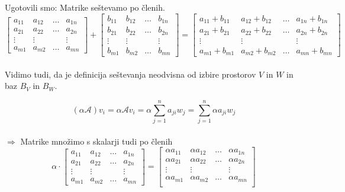 \documentclass[a4paper,12pt]{article}
\begin{document}
Ugotovili smo: Matrike seštevamo po členih. \\

$$
\begin{bmatrix}
	a_{11}&a_{12}&\ldots&a_{1n} \\
	a_{21}&a_{22}&\ldots&a_{2n} \\
	\vdots&\vdots&~&\vdots \\
	a_{m1}&a_{m2}&\ldots&a_{mn}
\end{bmatrix}
+
\begin{bmatrix}
	b_{11}&b_{12}&\ldots&b_{1n} \\
	b_{21}&b_{22}&\ldots&b_{2n} \\
	\vdots&\vdots&~&\vdots \\
	b_{m1}&b_{m2}&\ldots&b_{mn}
\end{bmatrix}
=
\begin{bmatrix}
	a_{11}+b_{11}&a_{12}+b_{12}&\ldots&a_{1n}+b_{1n} \\
	a_{21}+b_{21}&a_{22}+b_{22}&\ldots&a_{2n}+b_{2n} \\
	\vdots&\vdots&~&\vdots \\
	a_{m1}+b_{m1}&a_{m2}+b_{m2}&\ldots&a_{mn}+b_{mn}
\end{bmatrix}
$$ \\

Vidimo tudi, da je definicija seštevanja neodvisna od izbire prostorov $V$ in $W$ in baz $B_V$ in $B_W$.

$$ (\alpha \mathcal{A})v_i=\alpha \mathcal{A}v_i=\alpha \sum_{j=1}^n a_{ji} w_j=\sum_{j=1}^n \alpha a_{ji} w_j $$ \\

$\Rightarrow$ Matrike množimo s skalarji tudi po členih \\

$$ \alpha \cdot 
\begin{bmatrix}
	a_{11}&a_{12}&\ldots&a_{1n} \\
	a_{21}&a_{22}&\ldots&a_{2n} \\
	\vdots&\vdots&~&\vdots \\
	a_{m1}&a_{m2}&\ldots&a_{mn}
\end{bmatrix} =
\begin{bmatrix}
	\alpha a_{11}&\alpha a_{12}&\ldots&\alpha a_{1n} \\
	\alpha a_{21}&\alpha a_{22}&\ldots&\alpha a_{2n} \\
	\vdots&\vdots&~&\vdots \\
	\alpha a_{m1}&\alpha a_{m2}&\ldots&\alpha a_{mn} \\
\end{bmatrix} $$ \\
\end{document}
